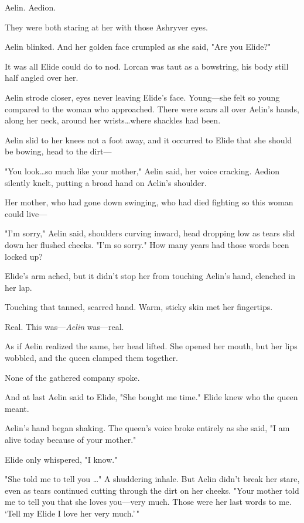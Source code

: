 Aelin.
Aedion.

They were both staring at her with those Ashryver eyes.

Aelin blinked.
And her golden face crumpled as she said, "Are you Elide?"

It was all Elide could do to nod.
Lorcan was taut as a bowstring, his body still half angled over her.

Aelin strode closer, eyes never leaving Elide's face.
Young---she felt so young compared to the woman who approached.
There were scars all over Aelin's hands, along her neck, around her wrists\ldots where shackles had been.

Aelin slid to her knees not a foot away, and it occurred to Elide that she should be bowing, head to the dirt---

"You look\ldots so much like your mother," Aelin said, her voice cracking.
Aedion silently knelt, putting a broad hand on Aelin's shoulder.

Her mother, who had gone down swinging, who had died fighting so this woman could live---

"I'm sorry," Aelin said, shoulders curving inward, head dropping low as tears slid down her flushed cheeks.
"I'm so sorry."
How many years had those words been locked up?

Elide's arm ached, but it didn't stop her from touching Aelin's hand, clenched in her lap.

Touching that tanned, scarred hand.
Warm, sticky skin met her fingertips.

Real.
This was---\emph{Aelin} was---real.

As if Aelin realized the same, her head lifted.
She opened her mouth, but her lips wobbled, and the queen clamped them together.

None of the gathered company spoke.

And at last Aelin said to Elide, "She bought me time."
Elide knew who the queen meant.

Aelin's hand began shaking.
The queen's voice broke entirely as she said, "I am alive today because of your mother."

Elide only whispered, "I know."

"She told me to tell you \ldots" A shuddering inhale.
But Aelin didn't break her stare, even as tears continued cutting through the dirt on her cheeks.
"Your mother told me to tell you that she loves you---very much.
Those were her last words to me.
`Tell my Elide I love her very much.'\,"

